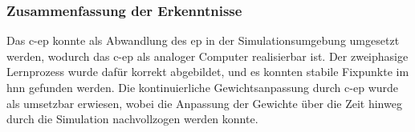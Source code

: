 \subsubsection{Zusammenfassung der Erkenntnisse}

Das \ac{c-ep} konnte als Abwandlung des \ac{ep} in der Simulationsumgebung umgesetzt werden, wodurch das \ac{c-ep} als analoger Computer realisierbar ist. Der zweiphasige Lernprozess wurde dafür korrekt abgebildet, und es konnten stabile Fixpunkte im \ac{hnn} gefunden werden. Die kontinuierliche Gewichtsanpassung durch \ac{c-ep} wurde als umsetzbar erwiesen, wobei die Anpassung der Gewichte über die Zeit hinweg durch die Simulation nachvollzogen werden konnte.
